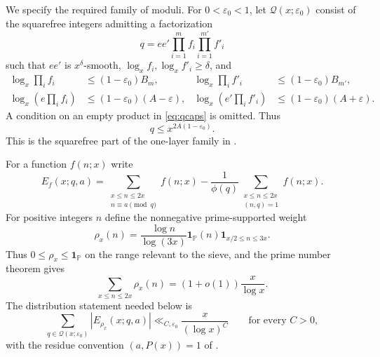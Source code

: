 \documentclass[11pt,reqno]{amsart}
\theoremstyle{definition}
\theoremstyle{remark}
\numberwithin{equation}{section}
\newcommand{\PP}{\mathbb P}
\newcommand{\ind}{\mathbf 1}
\newcommand{\Qset}{\mathcal Q}
\begin{document}
We specify the required family of moduli. For $0<\varepsilon_0<1$, let
$\Qset(x;\varepsilon_0)$ consist of the squarefree integers admitting a
factorization
\begin{equation}\label{eq:qfactor}
 q=ee'\prod_{i=1}^{m}f_i\prod_{i=1}^{m'}f'_i
\end{equation}
such that $ee'$ is $x^\delta$-smooth, $\log_x f_i,\log_x f'_i\ge\delta$,
and
\begin{align}
 \log_x\prod_i f_i&\le(1-\varepsilon_0)B_m,&
 \log_x\prod_i f'_i&\le(1-\varepsilon_0)B_{m'},\label{eq:qcaps}\\
 \log_x\left(e\prod_i f_i\right)&\le(1-\varepsilon_0)(A-\varepsilon),&
 \log_x\left(e'\prod_i f'_i\right)&\le(1-\varepsilon_0)(A+\varepsilon).
 \label{eq:qtotals}
\end{align}
A condition on an empty product in \eqref{eq:qcaps} is omitted. Thus
\begin{equation}\label{eq:qmaximum}
 q\le x^{2A(1-\varepsilon_0)}.
\end{equation}
This is the squarefree part of the one-layer family in
\cite[Definition~2]{Stadlmann26}.

For a function $f(n;x)$ write
\[
 E_f(x;q,a)=\sum_{\substack{x\le n\le2x\\n\equiv a\pmod q}}f(n;x)
 -\frac1{\phi(q)}\sum_{\substack{x\le n\le2x\\(n,q)=1}}f(n;x).
\]
For positive integers $n$ define the nonnegative prime-supported weight
\begin{equation}\label{eq:rho}
 \rho_x(n)=\frac{\log n}{\log(3x)}\ind_\PP(n)
             \ind_{x/2\le n\le3x}.
\end{equation}
Thus $0\leq\rho_x\leq\ind_\PP$ on the range relevant to the sieve, and
the prime number theorem gives
\[
 \sum_{x\leq n\leq2x}\rho_x(n)=(1+o(1))\frac{x}{\log x}.
\]
The distribution statement needed below is
\begin{equation}\label{eq:prime-distribution}
 \sum_{q\in\Qset(x;\varepsilon_0)}|E_{\rho_x}(x;q,a)|
 \ll_{C,\varepsilon_0}\frac{x}{(\log x)^C}
 \qquad\text{for every }C>0,
\end{equation}
with the residue convention $(a,P(x))=1$ of
\cite[Definition~3]{Stadlmann26}.
\end{document}

